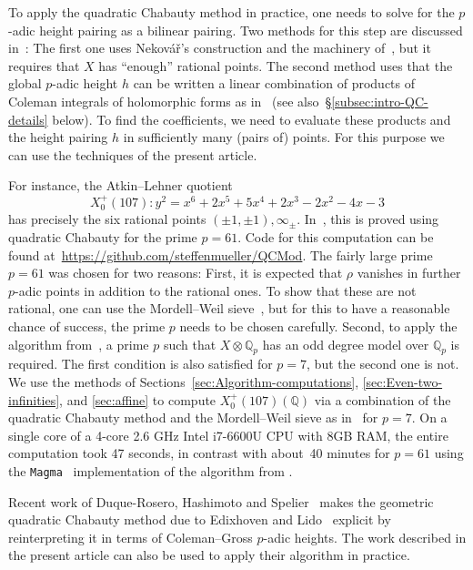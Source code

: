 \documentclass[11pt, a4paper]{amsart}
\newcommand{\Q}{\mathbb{Q}}
\theoremstyle{remark}
\numberwithin{equation}{section}
\begin{document}
To apply the quadratic Chabauty method in practice, one needs to 
solve for the $p$-adic height pairing
as a bilinear pairing. 
Two methods for this step are discussed in~\cite[\S3.3, \S3.5.4]{BDMTV2}: The first one uses Neko\-v\'{a}\v{r}'s construction and the machinery of~\cite{QC13}, but it requires that $X$ has ``enough'' rational points. 
The second method uses that 
the global $p$-adic height $h$ can be written a linear combination of products of
Coleman integrals of holomorphic forms as in~\cite{BBM1} (see
also~\S\ref{subsec:intro-QC-details} below). To find the coefficients, we need to evaluate these products and the height pairing $h$ in sufficiently many (pairs of) points. For this purpose we can use the techniques of the present article.

For instance, the Atkin--Lehner quotient
$$X_0^+(107)\colon y^2 = x^6 + 2x^5 + 5x^4 + 2x^3 - 2x^2 - 4x - 3$$
has precisely the six rational points $(\pm1, \pm1), \infty_{\pm}$.
In~\cite{BDMTV2}, this is proved using quadratic Chabauty for the prime
$p=61$. Code for this computation can be found
at~{\url{https://github.com/steffenmueller/QCMod}}.
The fairly large prime $p=61$ was chosen for two reasons: First,
it is expected that $\rho$ vanishes in further $p$-adic points
in addition to the rational ones. To show that these 
are not rational, one can use the Mordell--Weil
sieve~\cite{Bruin-Stoll-MW-Sieve}, but for this to have a reasonable chance of
success, the prime $p$ needs to be chosen carefully.
Second, to apply the algorithm from~\cite{BBHeights}, a prime $p$ such that  $X\otimes \Q_p$ has
an odd degree model over $\Q_p$ is required. 
The first condition is also satisfied for $p=7$, but the second one is not. We use the methods of Sections~\ref{sec:Algorithm-computations}, \ref{sec:Even-two-infinities}, and \ref{sec:affine} to compute  $X_0^+(107)(\Q)$ via a combination of the quadratic Chabauty method and the Mordell--Weil sieve as in~\cite{Jen-Netan-QCRP1, QC13, BDMTV2} for $p=7$. 
On 
a single core of a 4-core 2.6 GHz Intel i7-6600U CPU with 8GB RAM, the
entire computation took 47 seconds, in contrast with about~40
minutes for $p=61$ using the \texttt{Magma}~\cite{Magma} implementation of
the algorithm from \cite{BBHeights}. 

Recent work of Duque-Rosero, Hashimoto and Spelier~\cite{DRHS} makes the
geometric quadratic Chabauty method due to Edixhoven and Lido~\cite{EL19}
explicit by reinterpreting it in terms of Coleman--Gross $p$-adic heights. The work described in
the present article can also be used to apply their algorithm in practice.
\end{document}
